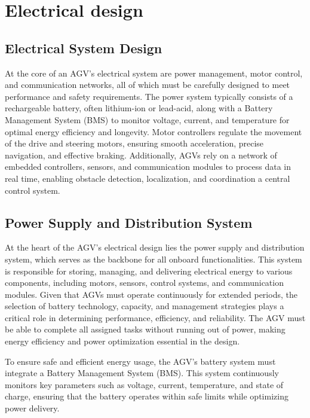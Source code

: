 \documentclass[../../main]{subfiles}
\begin{document}
\section{Electrical design}
\subsection{Electrical System Design}

At the core of an AGV’s electrical system are power management, motor control, 
and communication networks, all of which must be carefully designed to meet 
performance and safety requirements. The power system typically consists of 
a rechargeable battery, often lithium-ion or lead-acid, along with a Battery 
Management System (BMS) to monitor voltage, current, and temperature for 
optimal energy efficiency and longevity. Motor controllers regulate the 
movement of the drive and steering motors, ensuring smooth acceleration, 
precise navigation, and effective braking. Additionally, AGVs rely on a 
network of embedded controllers, sensors, and communication modules to 
process data in real time, enabling obstacle detection, localization, and 
coordination a central control system.

\subsection{Power Supply and Distribution System}

At the heart of the AGV's electrical design lies the 
power supply and distribution system, which serves as the backbone 
for all onboard functionalities. This system is responsible for 
storing, managing, and delivering electrical energy to various 
components, including motors, sensors, control systems, and 
communication modules. Given that AGVs must operate continuously 
for extended periods, the selection of battery technology, capacity, 
and management strategies plays a critical role in determining 
performance, efficiency, and reliability. The AGV must be able to 
complete all assigned tasks without running out of power, making 
energy efficiency and power optimization essential in the design. 

To ensure safe and efficient energy usage, the AGV's battery system 
must integrate a Battery Management System (BMS). 
This system continuously monitors key parameters such as voltage, 
current, temperature, and state of charge, ensuring that the battery 
operates within safe limits while optimizing power delivery. 
\end{document}
